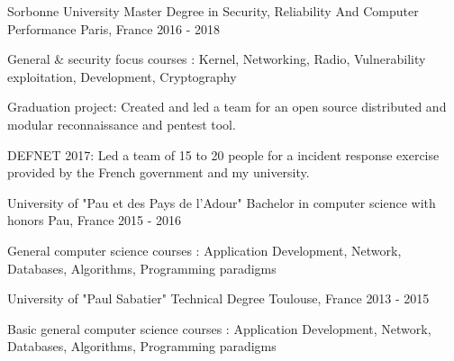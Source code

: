 

\begin{cventries}

  \cventry
    {Sorbonne University} %
    {Master Degree in Security, Reliability And Computer Performance } %
    {Paris, France} %
    {2016 - 2018} %
    {
      \begin{cvitems} %
        \item {General \& security focus courses : Kernel, Networking, Radio, Vulnerability exploitation, Development, Cryptography}
        \item {Graduation project: Created and led a team for an open source distributed and modular reconnaissance and pentest tool.}
        \item {DEFNET 2017: Led a team of 15 to 20 people for a incident response exercise provided by the French government and my university.}
      \end{cvitems}
    }

  \cventry
    {University of "Pau et des Pays de l'Adour"} %
    {Bachelor in computer science with honors } %
    {Pau, France} %
    {2015 - 2016} %
    {
      \begin{cvitems}
        \item {General computer science courses : Application Development, Network, Databases, Algorithms, Programming paradigms}
      \end{cvitems}
    }

  \cventry
    {University of "Paul Sabatier"} %
    {Technical Degree} %
    {Toulouse, France} %
    {2013 - 2015} %
    {
      \begin{cvitems}
        \item {Basic general computer science courses : Application Development, Network, Databases, Algorithms, Programming paradigms}
      \end{cvitems}
    }

\end{cventries}

